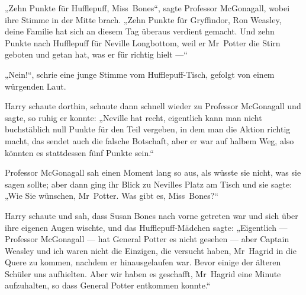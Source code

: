 „Zehn Punkte für Hufflepuff, Miss~Bones“, sagte Professor McGonagall, wobei ihre Stimme in der Mitte brach.
„Zehn Punkte für Gryffindor, Ron Weasley, deine Familie hat sich an diesem Tag überaus verdient gemacht. Und zehn Punkte nach Hufflepuff für Neville Longbottom, weil er Mr~Potter die Stirn geboten und getan hat, was er für richtig hielt —“

„Nein!“, schrie eine junge Stimme vom Hufflepuff-Tisch, gefolgt von einem würgenden Laut.

Harry schaute dorthin, schaute dann schnell wieder zu Professor McGonagall und sagte, so ruhig er konnte:
„Neville hat recht, eigentlich kann man nicht buchstäblich null Punkte für den Teil vergeben, in dem man die Aktion richtig macht, das sendet auch die falsche Botschaft, aber er war auf halbem Weg, also könnten es stattdessen fünf Punkte sein.“

Professor McGonagall sah einen Moment lang so aus, als wüsste sie nicht, was sie sagen sollte; aber dann ging ihr Blick zu Nevilles Platz am Tisch und sie sagte:
„Wie Sie wünschen, Mr~Potter. Was gibt es, Miss~Bones?“

Harry schaute und sah, dass Susan Bones nach vorne getreten war und sich über ihre eigenen Augen wischte, und das Hufflepuff-Mädchen sagte:
„Eigentlich — Professor McGonagall — hat General Potter es nicht gesehen — aber Captain Weasley und ich waren nicht die Einzigen, die versucht haben, Mr~Hagrid in die Quere zu kommen, nachdem er hinausgelaufen war. Bevor einige der älteren Schüler uns aufhielten. Aber wir haben es geschafft, Mr~Hagrid eine Minute aufzuhalten, so dass General Potter entkommen konnte.“

